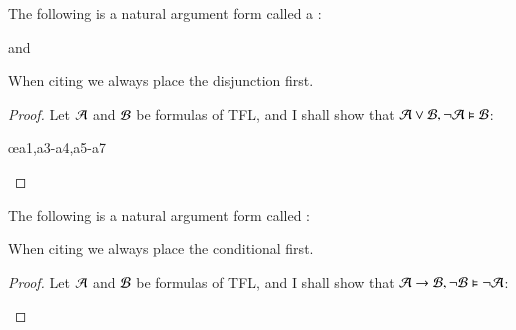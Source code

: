 \documentclass[12pt, a4paper, oneside, openright, titlepage]{book}
\begin{document}
\begin{defn}
    The following is a natural argument form called a : \begin{fitchproof}
         
    \end{fitchproof}
    and \begin{fitchproof}
         
    \end{fitchproof}
    When citing we always place the disjunction first.
\end{defn}
\begin{proof}
    Let $\mathcal{A}$ and $\mathcal{B}$ be formulas of TFL, and I shall show that $\mathcal{A}\vee\mathcal{B},\neg\mathcal{A}\vDash \mathcal{B}$:
    \begin{fitchproof}
        \open
             
        \close
        \open 
             
             
        \close
         \oe{a1,a3-a4,a5-a7}
    \end{fitchproof}
\end{proof}

\begin{defn}
    The following is a natural argument form called : \begin{fitchproof}
         
    \end{fitchproof}
    When citing we always place the conditional first.
\end{defn}
\begin{proof}
    Let $\mathcal{A}$ and $\mathcal{B}$ be formulas of TFL, and I shall show that $\mathcal{A}\rightarrow\mathcal{B},\neg\mathcal{B}\vDash \neg\mathcal{A}$:
    \begin{fitchproof}
        \open
             
             
        \close
         
    \end{fitchproof}
\end{proof}
\end{document}
